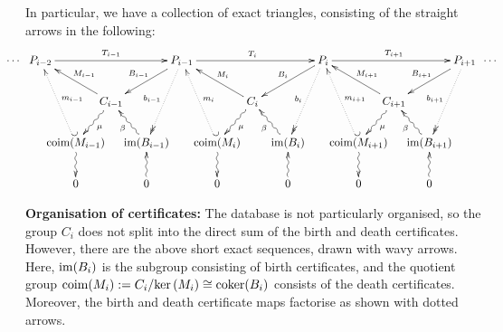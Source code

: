 \documentclass[11pt]{article}
\begin{document}
In particular, we have a collection of exact triangles, consisting of the
straight arrows in the following:
\[\xymatrix@!0@C=1.1cm@R=1.28cm{
\makebox[0cm][r]{$\cdots$\ \ }
P_{i-2}\ar[rrrr]^{T_{i-1}}%
&&&&\ar[dll]_{B_{i-1}}
\ar@{..>>}[ddl]_{b_{i-1}}
P_{i-1}\ar[rrrr]^{T_{i  }}%
&&&&\ar[dll]_{B_{i  }}
\ar@{..>>}[ddl]_{b_{i  }}
P_{i  }\ar[rrrr]^{T_{i+1}}%
&&&&\ar[dll]_{B_{i+1}}
\ar@{..>>}[ddl]_{b_{i+1}}
P_{i+1}\makebox[0cm][l]{\ \ $\cdots$}\\
&&C_{i-1}\ar[ull]_{M_{i-1}}\ar@{~>}[dl]^\mu&&
&&C_{i  }\ar[ull]_{M_{i  }}\ar@{~>}[dl]^\mu&&
&&C_{i+1}\ar[ull]_{M_{i+1}}\ar@{~>}[dl]^\mu&&
\\
&\coim(M_{i-1})\ar@{~>}[d]\ar@{_{(}..>}[uul]_{m_{i-1}}
&&\im(B_{i-1})\ar@{~>}[ul]^\beta&
&\coim(M_{i  })\ar@{~>}[d]\ar@{_{(}..>}[uul]_{m_{i  }}
&&\im(B_{i  })\ar@{~>}[ul]^\beta&
&\coim(M_{i+1})\ar@{~>}[d]\ar@{_{(}..>}[uul]_{m_{i+1}}
&&\im(B_{i+1})\ar@{~>}[ul]^\beta&
\\
&0&&0\ar@{~>}[u]&
&0&&0\ar@{~>}[u]&
&0&&0\ar@{~>}[u]&
}\]

\Bullet \textbf{Organisation of certificates:} The database is not particularly
organised, so the group $C_{i}$ does not split into the direct sum of the birth
and death certificates. However, there are the above short exact sequences,
drawn with wavy arrows. Here, $\operatorname{im}(B_{i})$ is the subgroup consisting of birth
certificates, and the quotient group
$\operatorname{coim}(M_{i}):=C_i/\textup{ker}\,(M_i)\cong\operatorname{coker}(B_i)$ consists of the death
certificates. Moreover, the birth and death certificate maps factorise as shown
with dotted arrows.
\end{document}
